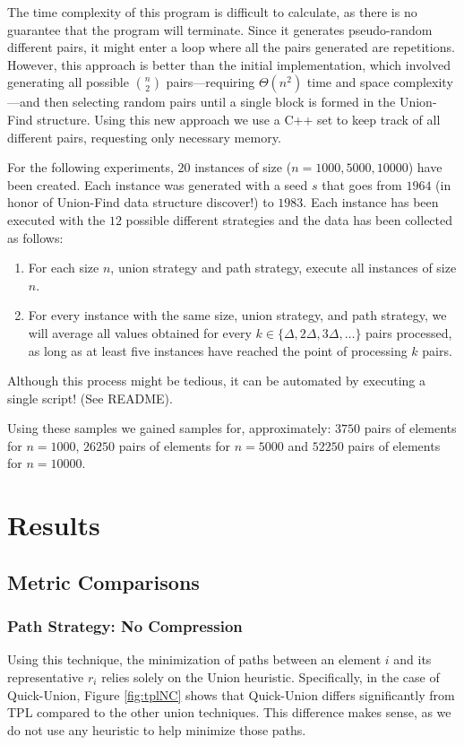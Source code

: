The time complexity of this program is difficult to calculate, as there is no guarantee that the program will terminate. Since it generates pseudo-random different pairs, it might enter a loop where all the pairs generated are repetitions. However, this approach is better than the initial implementation, which involved generating all possible \(n \choose 2 \) pairs—requiring \( \Theta(n^2) \) time and space complexity—and then selecting random pairs until a single block is formed in the Union-Find structure. Using this new approach we use a C++ set to keep track of all different pairs, requesting only necessary memory.

For the following experiments, $20$ instances of size ($n = 1000, 5000, 10000$) have been created. Each instance was generated with a seed $s$ that goes from $1964$ (in honor of Union-Find data structure discover\cite{galler1964improved}!) to $1983$. Each instance has been executed with the $12$ possible different strategies and the data has been collected as follows:

\begin{enumerate}
    \item For each size \( n \), union strategy and path strategy, execute all instances of size \( n \).
    \item For every instance with the same size, union strategy, and path strategy, we will average all values obtained for every \( k \in \{\Delta, 2\Delta, 3\Delta, \ldots\} \) pairs processed, as long as at least five instances have reached the point of processing \( k \) pairs.
\end{enumerate}

Although this process might be tedious, it can be automated by executing a single script! (See README).

Using these samples we gained samples for, approximately: $3750$ pairs of elements for $n = 1000$, $26250$ pairs of elements for $n = 5000$ and $52250$ pairs of elements for $n = 10000$. 

\section{Results}
\subsection{Metric Comparisons}
\subsubsection{Path Strategy: No Compression}
Using this technique, the minimization of paths between an element $i$ and its representative $r_i$ relies solely on the Union heuristic. Specifically, in the case of Quick-Union, Figure \ref{fig:tplNC} shows that Quick-Union differs significantly from TPL compared to the other union techniques. This difference makes sense, as we do not use any heuristic to help minimize those paths. 

